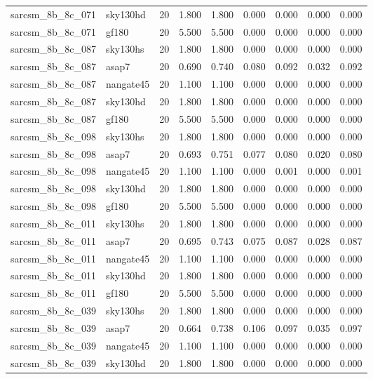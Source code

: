 \begin{tabular}{llrrrrrrr}
sarcsm\_8b\_8c\_071 & sky130hd & 20 & 1.800 & 1.800 & 0.000 & 0.000 & 0.000 & 0.000 \\
sarcsm\_8b\_8c\_071 & gf180 & 20 & 5.500 & 5.500 & 0.000 & 0.000 & 0.000 & 0.000 \\
sarcsm\_8b\_8c\_087 & sky130hs & 20 & 1.800 & 1.800 & 0.000 & 0.000 & 0.000 & 0.000 \\
sarcsm\_8b\_8c\_087 & asap7 & 20 & 0.690 & 0.740 & 0.080 & 0.092 & 0.032 & 0.092 \\
sarcsm\_8b\_8c\_087 & nangate45 & 20 & 1.100 & 1.100 & 0.000 & 0.000 & 0.000 & 0.000 \\
sarcsm\_8b\_8c\_087 & sky130hd & 20 & 1.800 & 1.800 & 0.000 & 0.000 & 0.000 & 0.000 \\
sarcsm\_8b\_8c\_087 & gf180 & 20 & 5.500 & 5.500 & 0.000 & 0.000 & 0.000 & 0.000 \\
sarcsm\_8b\_8c\_098 & sky130hs & 20 & 1.800 & 1.800 & 0.000 & 0.000 & 0.000 & 0.000 \\
sarcsm\_8b\_8c\_098 & asap7 & 20 & 0.693 & 0.751 & 0.077 & 0.080 & 0.020 & 0.080 \\
sarcsm\_8b\_8c\_098 & nangate45 & 20 & 1.100 & 1.100 & 0.000 & 0.001 & 0.000 & 0.001 \\
sarcsm\_8b\_8c\_098 & sky130hd & 20 & 1.800 & 1.800 & 0.000 & 0.000 & 0.000 & 0.000 \\
sarcsm\_8b\_8c\_098 & gf180 & 20 & 5.500 & 5.500 & 0.000 & 0.000 & 0.000 & 0.000 \\
sarcsm\_8b\_8c\_011 & sky130hs & 20 & 1.800 & 1.800 & 0.000 & 0.000 & 0.000 & 0.000 \\
sarcsm\_8b\_8c\_011 & asap7 & 20 & 0.695 & 0.743 & 0.075 & 0.087 & 0.028 & 0.087 \\
sarcsm\_8b\_8c\_011 & nangate45 & 20 & 1.100 & 1.100 & 0.000 & 0.000 & 0.000 & 0.000 \\
sarcsm\_8b\_8c\_011 & sky130hd & 20 & 1.800 & 1.800 & 0.000 & 0.000 & 0.000 & 0.000 \\
sarcsm\_8b\_8c\_011 & gf180 & 20 & 5.500 & 5.500 & 0.000 & 0.000 & 0.000 & 0.000 \\
sarcsm\_8b\_8c\_039 & sky130hs & 20 & 1.800 & 1.800 & 0.000 & 0.000 & 0.000 & 0.000 \\
sarcsm\_8b\_8c\_039 & asap7 & 20 & 0.664 & 0.738 & 0.106 & 0.097 & 0.035 & 0.097 \\
sarcsm\_8b\_8c\_039 & nangate45 & 20 & 1.100 & 1.100 & 0.000 & 0.000 & 0.000 & 0.000 \\
sarcsm\_8b\_8c\_039 & sky130hd & 20 & 1.800 & 1.800 & 0.000 & 0.000 & 0.000 & 0.000 \\

\end{tabular}
